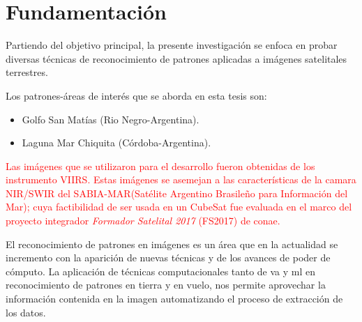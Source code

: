 \section{Fundamentación}\label{sec:fundamentacion}
Partiendo del objetivo principal, la presente investigación se enfoca en probar diversas técnicas de reconocimiento de patrones aplicadas a imágenes satelitales terrestres.  

Los patrones-áreas de interés que se aborda en esta tesis son:
\begin{itemize}
	\item Golfo San Matías (Rio Negro-Argentina).
	\item Laguna Mar Chiquita (Córdoba-Argentina).
\end{itemize}


\textcolor{red}{Las imágenes que se utilizaron para el desarrollo fueron obtenidas de los instrumento  VIIRS. Estas imágenes se asemejan a las características de la camara NIR/SWIR del SABIA-MAR(Satélite Argentino Brasileño para Información del Mar); cuya factibilidad de ser usada en un CubeSat fue evaluada en el marco del proyecto integrador \textit{Formador Satelital 2017} (FS2017) de \ac{conae}.}

El reconocimiento de patrones en imágenes es un área que en la actualidad se incremento con la aparición de nuevas técnicas y de los avances de poder de cómputo. La aplicación de técnicas computacionales tanto de  \ac{va} y \ac{ml} en reconocimiento de patrones  en tierra y en vuelo, nos permite aprovechar la información contenida en la imagen  automatizando el proceso de extracción de los datos.

